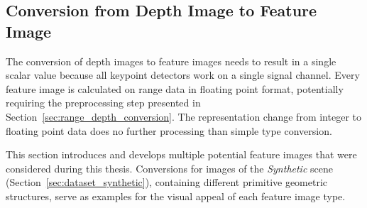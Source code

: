 \subsection{Conversion from Depth Image to Feature Image}\label{sec:feature_images}

The conversion of depth images to feature images needs to result in a single scalar value because all keypoint detectors work on a single signal channel.
Every feature image is calculated on range data in floating point format, potentially requiring the preprocessing step presented in Section~\ref{sec:range_depth_conversion}.
The representation change from integer to floating point data does no further processing than simple type conversion.

This section introduces and develops multiple potential feature images that were considered during this thesis.
Conversions for images of the \emph{Synthetic} scene (Section~\ref{sec:dataset_synthetic}), containing different primitive geometric structures, serve as examples for the visual appeal of each feature image type.






